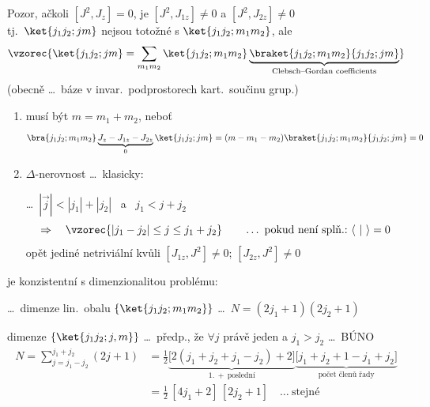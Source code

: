 Pozor, ačkoli $[J^2, J_z] = 0$, je \quad $[J^2, J_{1z}] \neq 0$ \quad a \quad $[J^2, J_{2z}] \neq 0$ \\
\quad tj.\ $\ket{j_1j_2;jm}$ nejsou totožné s $\ket{j_1j_2;m_1m_2}$, ale
\[
  \vzorec{\ket{j_1j_2;jm} = \sum_{m_1m_2}\ket{j_1j_2;m_1m_2}\underbrace{\braket{j_1j_2;m_1m_2}{j_1j_2;jm}}_{\text{Clebsch--Gordan coefficients}}}
\]
\quad (obecně \dots\ báze v invar.\ podprostorech kart.\ součinu grup.)

\begin{veta}
\begin{enumerate}[label=\textcircled{\arabic*}]
  \item musí být \quad $m = m_1 + m_2$, \quad neboť
  \[
    \bra{j_1j_2;m_1m_2}\underbrace{J_z - J_{1z} - J_{2z}}_{0}\ket{j_1j_2;jm} = (m - m_1 - m_2)\braket{j_1j_2;m_1m_2}{j_1j_2;jm} = 0
  \]
  \item $\Delta$-nerovnost \dots\ klasicky:
  \quad \dots\ $|\vec j| < |j_1| + |j_2|$ \ a \ $j_1 < j + j_2$
  \[
    \Rightarrow\quad \vzorec{|j_1 - j_2| \leq j \leq j_1 + j_2}
    \qquad\dots\ \text{pokud není splň.:}\ \langle\ |\ \rangle = 0
  \]
  {\color{defbarva}opět jediné netriviální kvůli $[J_{1z}, J^2] \neq 0$; $[J_{2z}, J^2] \neq 0$}
\end{enumerate}
\end{veta}

je konzistentní s dimenzionalitou problému:

\dots\ dimenze lin.\ obalu $\{\ket{j_1j_2;m_1m_2}\}$ \quad \dots\ $N = (2j_1+1)(2j_2+1)$

dimenze $\{\ket{j_1j_2;j,m}\}$ \quad \dots\ předp., že $\forall j$ právě jeden a $j_1 > j_2$ \dots\ BÚNO
\begin{align*}
  N = \sum_{j=j_1-j_2}^{j_1+j_2}(2j+1)
  &= \tfrac12\underbrace{\big[2(j_1+j_2+j_1-j_2) + 2\big]}_{1.\ +\ \text{poslední}}\underbrace{\big[j_1+j_2+1-j_1+j_2\big]}_{\text{počet členů řady}} \\
  &= \tfrac12\,[4j_1+2]\,[2j_2+1] \quad\dots\ \text{stejné}
\end{align*}

